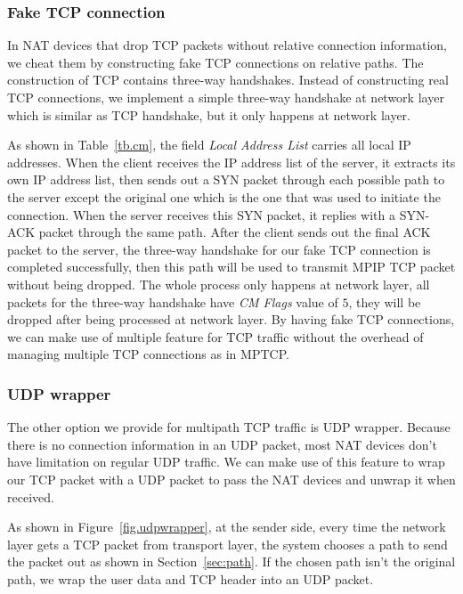 \subsubsection{Fake TCP connection}
In NAT devices that drop TCP packets without relative connection information, we cheat them by constructing fake TCP connections on relative paths. The construction of TCP contains three-way handshakes. Instead of constructing real TCP connections, we implement a simple three-way handshake at network layer which is similar as TCP handshake, but it only happens at network layer. 

As shown in Table~\ref{tb.cm}, the field \emph{Local Address List} carries all local IP addresses. When the client receives the IP address list of the server, it extracts its own IP address list, then sends out a SYN packet through each possible path to the server except the original one which is the one that was used to initiate the connection. When the server receives this SYN packet, it replies with a SYN-ACK packet through the same path. After the client sends out the final ACK packet to the server, the three-way handshake for our fake TCP connection is completed successfully, then this path will be used to transmit MPIP TCP packet without being dropped. The whole process only happens at network layer, all packets for the three-way handshake have \emph{CM Flags} value of $5$, they will be dropped after being processed at network layer. By having fake TCP connections, we can make use of multiple feature for TCP traffic without the overhead of managing multiple TCP connections as in MPTCP.

\subsubsection{UDP wrapper}
The other option we provide for multipath TCP traffic is UDP wrapper. Because there is no connection information in an UDP packet, most NAT devices don't have limitation on regular UDP traffic. We can make use of this feature to wrap our TCP packet with a UDP packet to pass the NAT devices and unwrap it when received.

As shown in Figure~\ref{fig.udpwrapper}, at the sender side, every time the network layer gets a TCP packet from transport layer, the system chooses a path to send the packet out as shown in Section~\ref{sec:path}. If the chosen path isn't the original path, we wrap the user data and TCP header into an UDP packet.


